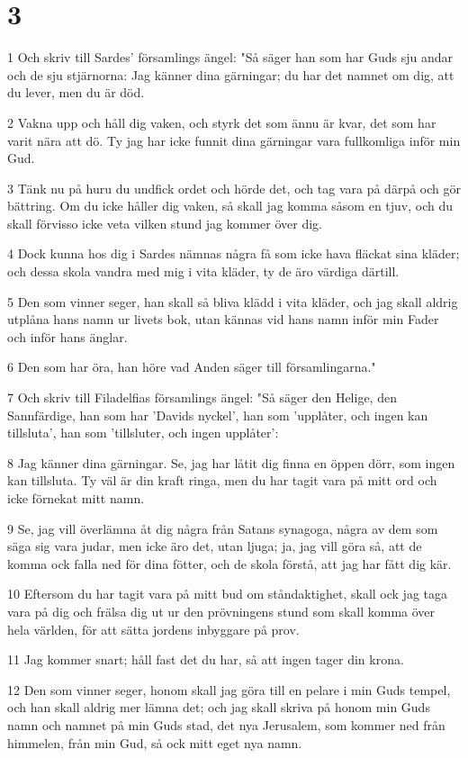 \chapter{3}

\par 1 Och skriv till Sardes' församlings ängel: "Så säger han som har Guds sju andar och de sju stjärnorna: Jag känner dina gärningar; du har det namnet om dig, att du lever, men du är död.
\par 2 Vakna upp och håll dig vaken, och styrk det som ännu är kvar, det som har varit nära att dö. Ty jag har icke funnit dina gärningar vara fullkomliga inför min Gud.
\par 3 Tänk nu på huru du undfick ordet och hörde det, och tag vara på därpå och gör bättring. Om du icke håller dig vaken, så skall jag komma såsom en tjuv, och du skall förvisso icke veta vilken stund jag kommer över dig.
\par 4 Dock kunna hos dig i Sardes nämnas några få som icke hava fläckat sina kläder; och dessa skola vandra med mig i vita kläder, ty de äro värdiga därtill.
\par 5 Den som vinner seger, han skall så bliva klädd i vita kläder, och jag skall aldrig utplåna hans namn ur livets bok, utan kännas vid hans namn inför min Fader och inför hans änglar.
\par 6 Den som har öra, han höre vad Anden säger till församlingarna."
\par 7 Och skriv till Filadelfias församlings ängel: "Så säger den Helige, den Sannfärdige, han som har 'Davids nyckel', han som 'upplåter, och ingen kan tillsluta', han som 'tillsluter, och ingen upplåter':
\par 8 Jag känner dina gärningar. Se, jag har låtit dig finna en öppen dörr, som ingen kan tillsluta. Ty väl är din kraft ringa, men du har tagit vara på mitt ord och icke förnekat mitt namn.
\par 9 Se, jag vill överlämna åt dig några från Satans synagoga, några av dem som säga sig vara judar, men icke äro det, utan ljuga; ja, jag vill göra så, att de komma ock falla ned för dina fötter, och de skola förstå, att jag har fått dig kär.
\par 10 Eftersom du har tagit vara på mitt bud om ståndaktighet, skall ock jag taga vara på dig och frälsa dig ut ur den prövningens stund som skall komma över hela världen, för att sätta jordens inbyggare på prov.
\par 11 Jag kommer snart; håll fast det du har, så att ingen tager din krona.
\par 12 Den som vinner seger, honom skall jag göra till en pelare i min Guds tempel, och han skall aldrig mer lämna det; och jag skall skriva på honom min Guds namn och namnet på min Guds stad, det nya Jerusalem, som kommer ned från himmelen, från min Gud, så ock mitt eget nya namn.
